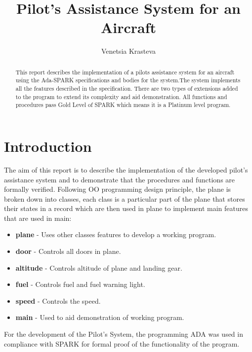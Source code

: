 \documentclass{llncs}
\date{}
\begin{document}
\author{Venetsia Krasteva}
\title{Pilot's Assistance System for an Aircraft}

\maketitle

\begin{abstract}
This report describes the implementation of a pilots assistance system for an aircraft using the Ada-SPARK specifications and bodies for the system.The system implements all the features described in the specification. There are two types of extensions added to the program to extend its complexity and aid demonstration. All functions and procedures pass Gold Level of SPARK which means it is a Platinum level program. 
\end{abstract}

\section{Introduction}\label{plane}
The aim of this report is to describe the implementation of the developed pilot's assistance system and to demonstrate that the procedures and functions are formally verified. Following OO programming design principle, the  plane is broken down into classes, each class is a particular part of the plane that stores their states in a record which are then used in plane to implement main features that are used in main:

\begin{itemize}
\item \textbf{plane} - Uses other classes features to develop a working program.
\item \textbf{door} - Controls all doors in plane.
\item \textbf{altitude} - Controls altitude of plane and landing gear.
\item \textbf{fuel} - Controls fuel and fuel warning light.
\item \textbf{speed} - Controls the speed.
\item \textbf{main} - Used to aid demonstration of working program.
\end{itemize}

For the development of the Pilot's System, the programming ADA was used in compliance with SPARK for formal proof of the functionality of the program. 
\end{document}
